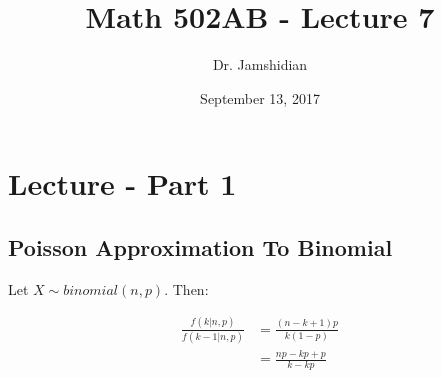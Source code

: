 \documentclass{article}
\title{Math 502AB - Lecture 7}
\author{Dr. Jamshidian}
\date{September 13, 2017}
\begin{document}
\maketitle

\section{Lecture - Part 1}

\subsection{Poisson Approximation To Binomial}

Let $X \sim binomial(n,p)$. Then:

\begin{equation*}
        \begin{split}
        \frac{f(k|n,p)}{f(k-1|n,p)} &= \frac{(n-k+1)p}{k(1-p)}\\
        &= \frac{np-kp+p}{k-kp}
    \end{split}    
\end{equation*}
\end{document}
